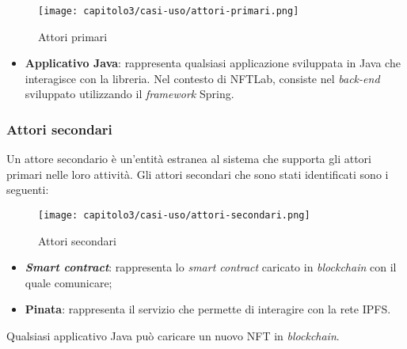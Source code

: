 \begin{figure}[h!]
  \centering
  \texttt{[image: capitolo3/casi-uso/attori-primari.png]}
  \caption{Attori primari}
\end{figure}

\begin{itemize}
  \item \textbf{Applicativo Java}: rappresenta qualsiasi applicazione sviluppata in Java che interagisce con la libreria. Nel contesto di NFTLab, consiste nel \textit{back-end} sviluppato utilizzando il \textit{framework} Spring.
\end{itemize}

\subsubsection{Attori secondari}
Un attore secondario è un'entità estranea al sistema che supporta gli attori primari nelle loro attività. Gli attori secondari che sono stati identificati sono i seguenti:

\begin{figure}[h!]
  \centering
  \texttt{[image: capitolo3/casi-uso/attori-secondari.png]}
  \caption{Attori secondari}
\end{figure}

\begin{itemize}
  \item \textbf{\textit{Smart contract}}: rappresenta lo \textit{smart contract} caricato in \textit{blockchain} con il quale comunicare;
  \item \textbf{Pinata}: rappresenta il servizio che permette di interagire con la rete IPFS.
\end{itemize}

\label{UC:upload-new-nft}

Qualsiasi applicativo Java può caricare un nuovo NFT in \textit{blockchain}.

